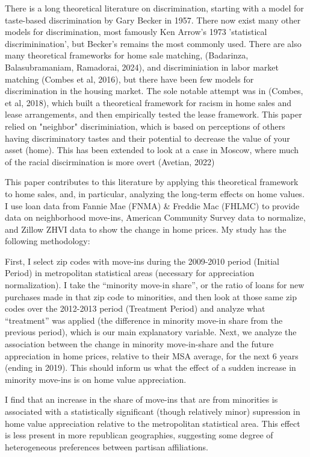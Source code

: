 \documentclass{article}
\begin{document}
There is a long theoretical literature on discrimination, starting with a model for taste-based discrimination by Gary Becker in 1957. There now exist many other models for discrimination, most famously Ken Arrow's 1973 'statistical discriminination', but Becker's remains the most commonly used. There are also many theoretical frameworks for home sale matching, (Badarinza, Balasubramaniam, Ramadorai, 2024), and discriminiation in labor market matching (Combes et al, 2016), but there have been few models for discrimination in the housing market. The sole notable attempt was in (Combes, et al, 2018), which built a theoretical framework for racism in home sales and lease arrangements, and then empirically tested the lease framework. This paper relied on "neighbor" discriminiation, which is based on perceptions of others having discriminatory tastes and their potential to decrease the value of your asset (home). This has been extended to look at a case in Moscow, where much of the racial discirmination is more overt (Avetian, 2022)

This paper contributes to this literature by applying this theoretical framework to home sales, and, in particular, analyzing the long-term effects on home values. I use loan data from Fannie Mae (FNMA) \& Freddie Mac (FHLMC) to provide data on neighborhood move-ins, American Community Survey data to normalize, and Zillow ZHVI data to show the change in home prices. My study has the following methodology:

First, I select zip codes with move-ins during the 2009-2010 period  (Initial Period) in metropolitan statistical areas (necessary for appreciation normalization). I take the ``minority move-in share'', or the ratio of loans for new purchases made in that zip code to minorities, and then look at those same zip codes over the 2012-2013 period (Treatment Period) and analyze what ``treatment'' was applied (the difference in minority move-in share from the previous period), which is our main explanatory variable. Next, we analyze the association between the change in minority move-in-share and the future appreciation in home prices, relative to their MSA average, for the next 6 years (ending in 2019). This should inform us what the effect of a sudden increase in minority move-ins is on home value appreciation.

I find that an increase in the share of move-ins that are from minorities is associated with a statistically significant (though relatively minor) supression in home value appreciation relative to the metropolitan statistical area. This effect is less present in more republican geographies, suggesting some degree of heterogeneous preferences between partisan affiliations.
\newpage
\end{document}

